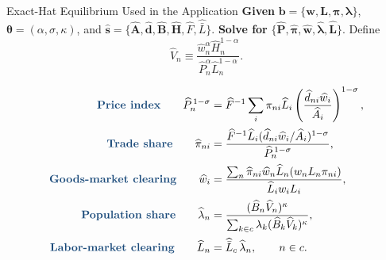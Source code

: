 \documentclass[aspectratio=169,11pt]{beamer}
\newcommand{\B}[1]{\textcolor{blue1}{\textbf{#1}}}
\begin{document}
\begin{frame}[t]{Exact-Hat Equilibrium Used in the Application}
  \scriptsize
  \setlength{\abovedisplayskip}{3pt}
  \setlength{\belowdisplayskip}{3pt}
  \B{Given}\quad
  \(\mathbf b=\{\mathbf w,\mathbf L,\boldsymbol\pi,\boldsymbol\lambda\}\),
  \(\boldsymbol\theta=(\alpha,\sigma,\kappa)\), and
  \(\widehat{\mathbf s}
    =\{\widehat{\mathbf A},\widehat{\mathbf d},
    \widehat{\mathbf B},\widehat{\mathbf H},
    \widehat F,\widehat{\bar L}\}\).
  \qquad
  \B{Solve for}\quad
  \(\{\widehat{\mathbf P},\widehat{\boldsymbol\pi},
  \widehat{\mathbf w},\widehat{\boldsymbol\lambda},\widehat{\mathbf L}\}\).
  Define
  \[
    \widehat V_n
    \equiv
    \frac{\widehat w_n^\alpha\widehat H_n^{1-\alpha}}
    {\widehat P_n^\alpha\widehat L_n^{1-\alpha}}.
  \]

  \vspace{-0.4em}
  \begin{align*}
    \text{\B{Price index}}\qquad
    \widehat P_n^{\,1-\sigma}
      &=
      \widehat F^{-1}\sum_i\pi_{ni}\widehat L_i
      \left(
        \frac{\widehat d_{ni}\widehat w_i}{\widehat A_i}
      \right)^{1-\sigma},
      \\[0.15em]
    \text{\B{Trade share}}\qquad
    \widehat\pi_{ni}
      &=
      \frac{\widehat F^{-1}\widehat L_i
      (\widehat d_{ni}\widehat w_i/\widehat A_i)^{1-\sigma}}
      {\widehat P_n^{\,1-\sigma}},
      \\[0.15em]
    \text{\B{Goods-market clearing}}\qquad
    \widehat w_i
      &=
      \frac{\sum_n
      \widehat\pi_{ni}\widehat w_n\widehat L_n
      (w_nL_n\pi_{ni})}
      {\widehat L_iw_iL_i},
      \\[0.15em]
    \text{\B{Population share}}\qquad
    \widehat\lambda_n
      &=
      \frac{(\widehat B_n\widehat V_n)^\kappa}
      {\sum_{k\in c}\lambda_k
      (\widehat B_k\widehat V_k)^\kappa},
      \\[0.15em]
    \text{\B{Labor-market clearing}}\qquad
    \widehat L_n
      &=\widehat{\bar L}_c\,\widehat\lambda_n,
      \qquad n\in c .
  \end{align*}

\end{frame}
\end{document}
